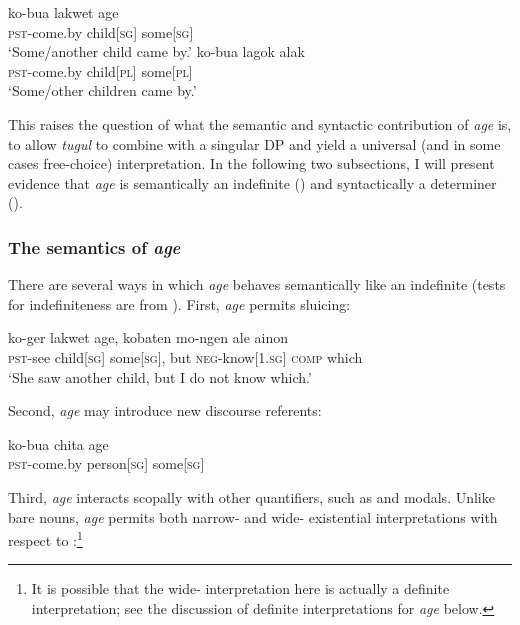 \documentclass[output=paper]{LSP/langsci}
\begin{document}
\ea \label{ex:agealak}  
\ea
\gll ko-bua lakwet age\\
	   \textsc{pst}-come.by child[\textsc{sg}] some[\textsc{sg}]\\
  \glt ‘Some/another child came by.’
\ex 
\gll ko-bua lagok alak\\
	   \textsc{pst}-come.by child[\textsc{pl}] some[\textsc{pl}]\\
  \glt ‘Some/other children came by.’
  \z
\z

This raises the question of what the semantic and syntactic contribution of \textit{age} is, to allow \textit{tugul} to combine with a singular DP and yield a universal (and in some cases free-choice) interpretation. In the following two subsections, I will present evidence that \textit{age} is semantically an indefinite () and syntactically a determiner ().

\subsubsection{The semantics of \textit{age}}
\label{sec:landman:agesem}
There are several ways in which \textit{age} behaves semantically like an indefinite (tests for indefiniteness are from \citealt{Matthewson:1999}). First, \textit{age} permits sluicing:

\ea \label{ex:landman:sluicingage}
    \gll ko-ger lakwet age, kobaten mo-ngen ale ainon\\
         \textsc{pst}-see child[\textsc{sg}] some[\textsc{sg}], but \textsc{neg}-know[1.\textsc{sg}] \textsc{comp} which\\
    \glt ‘She saw another child, but I do not know which.’
\z

\noindent Second, \textit{age} may introduce new discourse referents:

\ea
  \gll ko-bua chita age\\
       \textsc{pst}-come.by person[\textsc{sg}] some[\textsc{sg}]\\
\z

\noindent Third, \textit{age} interacts scopally with other quantifiers, such as  and modals. Unlike bare nouns, \textit{age} permits both narrow- and wide- existential interpretations with respect to :\footnote{It is possible that the wide- interpretation here is actually a definite interpretation; see the discussion of definite interpretations for \textit{age} below.}
\end{document}
